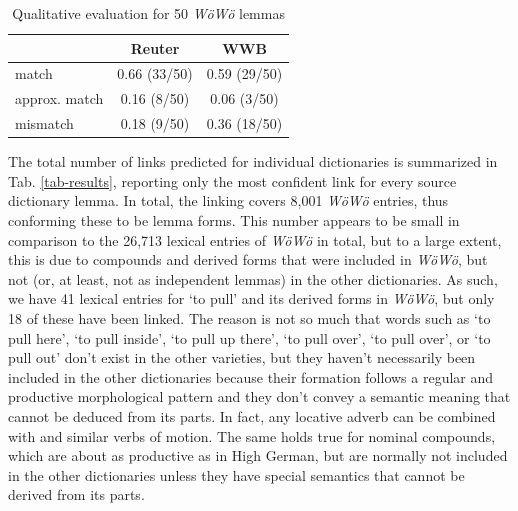 \begin{table}
        \centering
        {\small 
        \begin{tabular}{lcc}
        & Reuter           & WWB \\\hline
        match                   & 0.66 (33/50) & 0.59 (29/50) \\
        approx. match     & 0.16 (8/50) & 0.06 (3/50) \\
        mismatch                & 0.18 (9/50) & 0.36 (18/50) \\
    \end{tabular}
    } %
    \caption{Qualitative evaluation for 50 \emph{WöWö} lemmas}
    \label{tab-eval}
\end{table}


The total number of links predicted for individual dictionaries is summarized in Tab. \ref{tab-results}, reporting only the most confident link for every source dictionary lemma.
In total, the linking covers 8,001 \emph{WöWö} entries, thus conforming these to be lemma forms. This number appears to be small in comparison to the 26,713 lexical entries of \emph{WöWö} in total, but to a large extent, this is due to compounds and derived forms that were included in \emph{WöWö}, but not (or, at least, not as independent lemmas) in the other dictionaries. As such, we have 41 lexical entries for  `to pull' and its derived forms in \emph{WöWö}, but only 18 of these have been linked. The reason is not so much that words such as  `to pull here',  `to pull inside',  `to pull up there',  `to pull over',  `to pull over', or  `to pull out' don't exist in the other varieties, but they haven't necessarily been included in the other dictionaries because their formation follows a regular and productive morphological pattern and they don't convey a semantic meaning that cannot be deduced from its parts. In fact, any locative adverb can be combined with  and similar verbs of motion. The same holds true for nominal compounds, which are about as productive as in High German, but are normally not included in the other dictionaries unless they have special semantics that cannot be derived from its parts.

